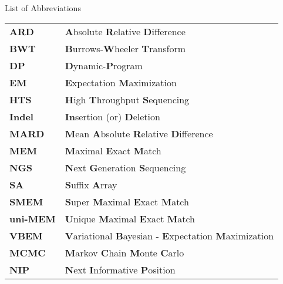 

\renewcommand{\baselinestretch}{1}
\small\normalsize
\hbox{\ }

\vspace{.5in}

\begin{center}
\large{List of Abbreviations}
\end{center} 

\vspace{3pt}

\begin{supertabular}{ll}


\textbf{ARD} & \textbf{A}bsolute  \textbf{R}elative \textbf{D}ifference\\
\textbf{BWT} & \textbf{B}urrows-\textbf{W}heeler \textbf{T}ransform\\
\textbf{DP} & \textbf{D}ynamic-\textbf{P}rogram\\
\textbf{EM} & \textbf{E}xpectation \textbf{M}aximization\\
\textbf{HTS} & \textbf{H}igh \textbf{T}hroughput \textbf{S}equencing\\
\textbf{Indel} & \textbf{In}sertion (or) \textbf{D}eletion\\
\textbf{MARD} & \textbf{M}ean \textbf{A}bsolute  \textbf{R}elative \textbf{D}ifference\\
\textbf{MEM} & \textbf{M}aximal \textbf{E}xact \textbf{M}atch\\
\textbf{NGS} & \textbf{N}ext \textbf{G}eneration \textbf{S}equencing\\
\textbf{SA} & \textbf{S}uffix \textbf{A}rray\\
\textbf{SMEM} & \textbf{S}uper \textbf{M}aximal \textbf{E}xact \textbf{M}atch\\
\textbf{uni-MEM} & \textbf{U}nique \textbf{M}aximal \textbf{E}xact \textbf{M}atch\\
\textbf{VBEM} & \textbf{V}ariational \textbf{B}ayesian - \textbf{E}xpectation \textbf{M}aximization\\
\textbf{MCMC} & \textbf{M}arkov \textbf{C}hain \textbf{M}onte \textbf{C}arlo\\    
\textbf{NIP} & \textbf{N}ext \textbf{I}nformative \textbf{P}osition\\

\end{supertabular}
